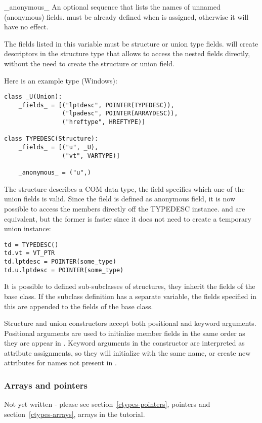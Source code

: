 \begin{memberdesc}{_anonymous_}
An optional sequence that lists the names of unnamed (anonymous)
fields.   must be already defined when 
is assigned, otherwise it will have no effect.

The fields listed in this variable must be structure or union type
fields.   will create descriptors in the structure type
that allows to access the nested fields directly, without the need
to create the structure or union field.

Here is an example type (Windows):
\begin{verbatim}
class _U(Union):
    _fields_ = [("lptdesc", POINTER(TYPEDESC)),
                ("lpadesc", POINTER(ARRAYDESC)),
                ("hreftype", HREFTYPE)]

class TYPEDESC(Structure):
    _fields_ = [("u", _U),
                ("vt", VARTYPE)]

    _anonymous_ = ("u",)
\end{verbatim}

The  structure describes a COM data type, the 
field specifies which one of the union fields is valid.  Since the
 field is defined as anonymous field, it is now possible to
access the members directly off the TYPEDESC instance.
 and  are equivalent, but the former
is faster since it does not need to create a temporary union
instance:
\begin{verbatim}
td = TYPEDESC()
td.vt = VT_PTR
td.lptdesc = POINTER(some_type)
td.u.lptdesc = POINTER(some_type)
\end{verbatim}
\end{memberdesc}

It is possible to defined sub-subclasses of structures, they inherit
the fields of the base class.  If the subclass definition has a
separate  variable, the fields specified in this are
appended to the fields of the base class.

Structure and union constructors accept both positional and
keyword arguments.  Positional arguments are used to initialize member
fields in the same order as they are appear in .  Keyword
arguments in the constructor are interpreted as attribute assignments,
so they will initialize  with the same name, or create new
attributes for names not present in .


\subsubsection{Arrays and pointers\label{ctypes-arrays-pointers}}

Not yet written - please see section~\ref{ctypes-pointers}, pointers and
section~\ref{ctypes-arrays}, arrays in the tutorial.

